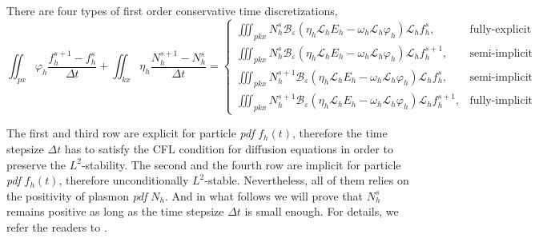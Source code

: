 \documentclass{article}
\numberwithin{equation}{section}
\begin{document}
There are four types of first order conservative time discretizations,
\begin{equation*}
    \iint_{px}\varphi_{h}\frac{f_{h}^{s+1}-f_{h}^{s}}{\Delta t}+\iint_{kx}\eta_{h}\frac{N_{h}^{s+1}-N_{h}^{s}}{\Delta t}=\begin{cases}
\iiint_{pkx}N_{h}^{s}\mathcal{B}_{\varepsilon}\left(\eta_{h}\mathcal{L}_{h}E_{h}-\omega_{h}\mathcal{L}_{h}\varphi_{h}\right)\mathcal{L}_{h}f_{h}^{s}, & \text{fully-explicit}\\
\iiint_{pkx}N_{h}^{s}\mathcal{B}_{\varepsilon}\left(\eta_{h}\mathcal{L}_{h}E_{h}-\omega_{h}\mathcal{L}_{h}\varphi_{h}\right)\mathcal{L}_{h}f_{h}^{s+1}, & \text{semi-implicit}\\
\iiint_{pkx}N_{h}^{s+1}\mathcal{B}_{\varepsilon}\left(\eta_{h}\mathcal{L}_{h}E_{h}-\omega_{h}\mathcal{L}_{h}\varphi_{h}\right)\mathcal{L}_{h}f_{h}^{s}, & \text{semi-implicit}\\
\iiint_{pkx}N_{h}^{s+1}\mathcal{B}_{\varepsilon}\left(\eta_{h}\mathcal{L}_{h}E_{h}-\omega_{h}\mathcal{L}_{h}\varphi_{h}\right)\mathcal{L}_{h}f_{h}^{s+1}, & \text{fully-implicit}
\end{cases}
\end{equation*}

The first and third row are explicit for particle \textit{pdf} $f_{h}(t)$, therefore the time stepsize $\Delta t$ has to satisfy the CFL condition for diffusion equations in order to preserve the $L^{2}$-stability. The second and the fourth row are implicit for particle \textit{pdf} $f_{h}(t)$, therefore unconditionally $L^{2}$-stable. Nevertheless, all of them relies on the positivity of plasmon \textit{pdf} $N_{h}$. And in what follows we will prove that $N^{s}_{h}$ remains positive as long as the time stepsize $\Delta t$ is small enough. For details, we refer the readers to \cite{huang2023conservative}.
\end{document}
